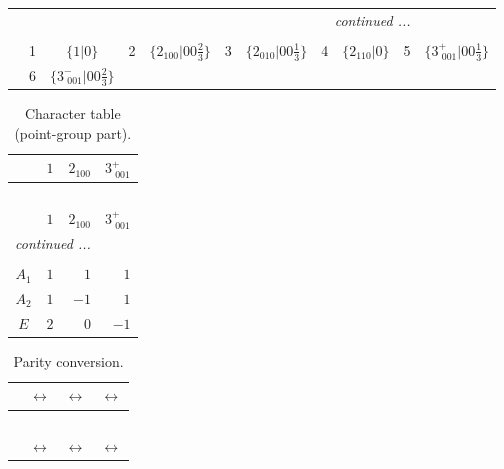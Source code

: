 \documentclass[fleqn,10pt,landscape]{article}
\begin{document}
\begin{itemize}
\begin{center}
\begin{longtable}{c|cc|cc|cc|cc|cc}
 \hline \hline
\multicolumn{10}{r}{\footnotesize\it continued ...} \\ \endfoot

 \hline \hline
\multicolumn{10}{r}{} \\ \endlastfoot

 & 1 & $\{1|0\}$ & 2 & $\{2{}_{100}|0 0 \frac{2}{3}\}$ & 3 & $\{2{}_{010}|0 0 \frac{1}{3}\}$ & 4 & $\{2{}_{110}|0\}$ & 5 & $\{3^{+}_{\,\,001}|0 0 \frac{1}{3}\}$ \\
& 6 & $\{3^{-}_{\,\,001}|0 0 \frac{2}{3}\}$ &  &  &  &  &  &  &  &  \\
\end{longtable}
\end{center}
\begin{center}
\renewcommand{\arraystretch}{1.0}
\begin{longtable}{c|rrr}
\caption{Character table (point-group part).}
 \\
 \hline \hline
 & $ 1 $ & $ 2{}_{100} $ & $ 3^{+}_{\,\,001} $ \\ \hline \endfirsthead

\multicolumn{3}{l}{\tablename\ \thetable{}} \\
 \hline \hline
 & $ 1 $ & $ 2{}_{100} $ & $ 3^{+}_{\,\,001} $ \\ \hline \endhead

 \hline \hline
\multicolumn{3}{r}{\footnotesize\it continued ...} \\ \endfoot

 \hline \hline
\multicolumn{3}{r}{} \\ \endlastfoot

$ A_{1} $ & $ 1 $ & $ 1 $ & $ 1 $ \\
$ A_{2} $ & $ 1 $ & $ -1 $ & $ 1 $ \\
$ E $ & $ 2 $ & $ 0 $ & $ -1 $ \\
\end{longtable}
\end{center}
\begin{center}
\renewcommand{\arraystretch}{1.0}
\begin{longtable}{cccc}
\caption{Parity conversion.}
 \\
 \hline \hline
 & $\leftrightarrow$ & $\leftrightarrow$ & $\leftrightarrow$ \\ \hline \endfirsthead

\multicolumn{3}{l}{\tablename\ \thetable{}} \\
 \hline \hline
 & $\leftrightarrow$ & $\leftrightarrow$ & $\leftrightarrow$ \\ \hline \endhead


\end{longtable}
\end{center}
\end{itemize}
\end{document}
